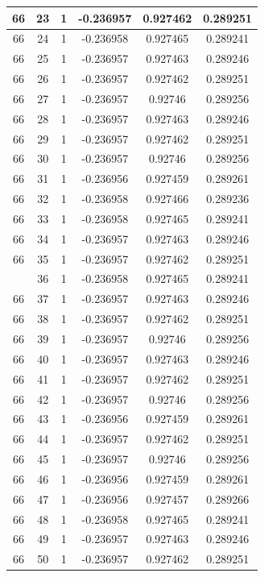 \documentclass[12pt,a4paper]{article}
\numberwithin{equation}{section}
\numberwithin{figure}{section}
\numberwithin{table}{section}
\begin{document}
\begin{longtable}{|c|c|c|c|c|c|}
66 & 23 & 1 & -0.236957 & 0.927462 & 0.289251 \\ \hline
66 & 24 & 1 & -0.236958 & 0.927465 & 0.289241 \\ \hline
66 & 25 & 1 & -0.236957 & 0.927463 & 0.289246 \\ \hline
66 & 26 & 1 & -0.236957 & 0.927462 & 0.289251 \\ \hline
66 & 27 & 1 & -0.236957 & 0.92746 & 0.289256 \\ \hline
66 & 28 & 1 & -0.236957 & 0.927463 & 0.289246 \\ \hline
66 & 29 & 1 & -0.236957 & 0.927462 & 0.289251 \\ \hline
66 & 30 & 1 & -0.236957 & 0.92746 & 0.289256 \\ \hline
66 & 31 & 1 & -0.236956 & 0.927459 & 0.289261 \\ \hline
66 & 32 & 1 & -0.236958 & 0.927466 & 0.289236 \\ \hline
66 & 33 & 1 & -0.236958 & 0.927465 & 0.289241 \\ \hline
66 & 34 & 1 & -0.236957 & 0.927463 & 0.289246 \\ \hline
66 & 35 & 1 & -0.236957 & 0.927462 & 0.289251 \\ \hline
\pagebreak
66 & 36 & 1 & -0.236958 & 0.927465 & 0.289241 \\ \hline
66 & 37 & 1 & -0.236957 & 0.927463 & 0.289246 \\ \hline
66 & 38 & 1 & -0.236957 & 0.927462 & 0.289251 \\ \hline
66 & 39 & 1 & -0.236957 & 0.92746 & 0.289256 \\ \hline
66 & 40 & 1 & -0.236957 & 0.927463 & 0.289246 \\ \hline
66 & 41 & 1 & -0.236957 & 0.927462 & 0.289251 \\ \hline
66 & 42 & 1 & -0.236957 & 0.92746 & 0.289256 \\ \hline
66 & 43 & 1 & -0.236956 & 0.927459 & 0.289261 \\ \hline
66 & 44 & 1 & -0.236957 & 0.927462 & 0.289251 \\ \hline
66 & 45 & 1 & -0.236957 & 0.92746 & 0.289256 \\ \hline
66 & 46 & 1 & -0.236956 & 0.927459 & 0.289261 \\ \hline
66 & 47 & 1 & -0.236956 & 0.927457 & 0.289266 \\ \hline
66 & 48 & 1 & -0.236958 & 0.927465 & 0.289241 \\ \hline
66 & 49 & 1 & -0.236957 & 0.927463 & 0.289246 \\ \hline
66 & 50 & 1 & -0.236957 & 0.927462 & 0.289251 \\ \hline

\end{longtable}
\end{document}
